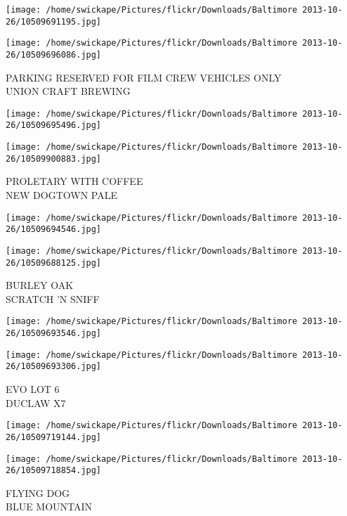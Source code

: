\documentclass[10pt,letterpaper]{article}
\begin{document}
\texttt{[image: /home/swickape/Pictures/flickr/Downloads/Baltimore 2013-10-26/10509691195.jpg]}

\vspace{0.25in}
\texttt{[image: /home/swickape/Pictures/flickr/Downloads/Baltimore 2013-10-26/10509696086.jpg]}

PARKING RESERVED FOR FILM CREW VEHICLES ONLY\\
UNION CRAFT BREWING\\
\pagebreak

\texttt{[image: /home/swickape/Pictures/flickr/Downloads/Baltimore 2013-10-26/10509695496.jpg]}

\vspace{0.25in}
\texttt{[image: /home/swickape/Pictures/flickr/Downloads/Baltimore 2013-10-26/10509900883.jpg]}

PROLETARY WITH COFFEE\\
NEW DOGTOWN PALE\\
\pagebreak

\texttt{[image: /home/swickape/Pictures/flickr/Downloads/Baltimore 2013-10-26/10509694546.jpg]}

\vspace{0.25in}
\texttt{[image: /home/swickape/Pictures/flickr/Downloads/Baltimore 2013-10-26/10509688125.jpg]}

BURLEY OAK\\
SCRATCH 'N SNIFF\\
\pagebreak

\texttt{[image: /home/swickape/Pictures/flickr/Downloads/Baltimore 2013-10-26/10509693546.jpg]}

\vspace{0.25in}
\texttt{[image: /home/swickape/Pictures/flickr/Downloads/Baltimore 2013-10-26/10509693306.jpg]}

EVO LOT 6\\
DUCLAW X7\\
\pagebreak

\texttt{[image: /home/swickape/Pictures/flickr/Downloads/Baltimore 2013-10-26/10509719144.jpg]}

\vspace{0.25in}
\texttt{[image: /home/swickape/Pictures/flickr/Downloads/Baltimore 2013-10-26/10509718854.jpg]}

FLYING DOG\\
BLUE MOUNTAIN\\
\pagebreak
\end{document}
